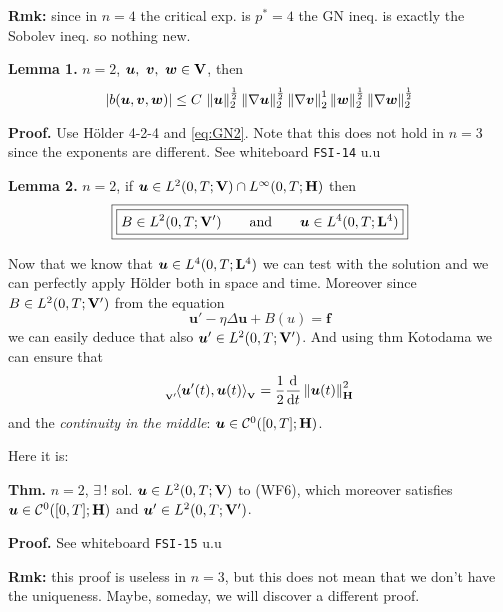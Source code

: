 \textbf{Rmk:} since in $n=4$ the critical exp. is $p^*=4$ the GN ineq. is exactly the Sobolev ineq. so nothing new.

\newcolumn

\textbf{Lemma 1.} $n=2$, $\bm u,\ \bm v,\ \bm w \in \mathbf{V}$, then
\begin{equation*}
\left| b(\bm u,\bm v,\bm w) \right|\leq C\,\left\lVert  \bm u \right\rVert_2^{\frac{1}{2}} \left\lVert \nabla \bm u \right\rVert_2^{\frac{1}{2}} \left\lVert \nabla \bm v \right\rVert_2^{1} \left\lVert  \bm w \right\rVert_2^{\frac{1}{2}} \left\lVert \nabla \bm w \right\rVert_2^{\frac{1}{2}}
\end{equation*}

\textbf{\color{lavender(floral)}Proof.} Use Hölder 4-2-4 and \eqref{eq:GN2}. Note that this does not hold in $n=3$ since the exponents are different. See whiteboard \texttt{FSI-14} u.u

\smallskip

\textbf{Lemma 2.} $n=2$, if $\bm u \in L^2(0,T;\mathbf{V})\cap L^\infty(0,T;\mathbf{H})$ then
\begin{equation*}
\boxed{\boxed{B\in L^2(0,T;\mathbf{V}')\qquad \text{and}\qquad \bm u\in L^4(0,T;\mathbf{L}^4)}}
\end{equation*}

Now that we know that $\bm u\in L^4(0,T;\mathbf{L}^4)$ we can test with the solution and we can perfectly apply Hölder both in space and time. Moreover since $B\in L^2(0,T;\mathbf{V}')$ from the equation 
\begin{equation*}
\bm u'-\eta\Delta\bm u+B(u)=\bm f
\end{equation*}
we can easily deduce that also $\bm u'\in L^2(0,T;\mathbf{V}')$. And using thm Kotodama we can ensure that 
$$
{}_{_{\mathbf{V}'}}\!\langle  \bm u'(t),\bm u(t)  \rangle{}_{_{\mathbf{V}}}=\frac{1}{2} 
\frac{\mathrm{d}}{\mathrm{d} t} \left\lVert \bm u(t) \right\rVert_{\mathbf{H}}^2 
$$
and the \emph{continuity in the middle}: $\bm u \in \mathcal{C}^0([0,T];\mathbf{H})$.

\medskip

Here it is:

\smallskip

\textbf{Thm.} $n=2$, $\exists\,!$ sol. $\bm u\in L^2(0,T;\mathbf{V})$ to (WF6), which moreover satisfies $\bm u\in \mathcal{C}^0([0,T];\mathbf{H})$ and $\bm u'\in L^2(0,T;\mathbf{V}')$.

\smallskip

\textbf{\color{lavender(floral)}Proof.} See whiteboard \texttt{FSI-15} u.u

\smallskip

\textbf{Rmk:} this proof is useless in $n=3$, but this does not mean that we don't have the uniqueness. Maybe, someday, we will discover a different proof.


